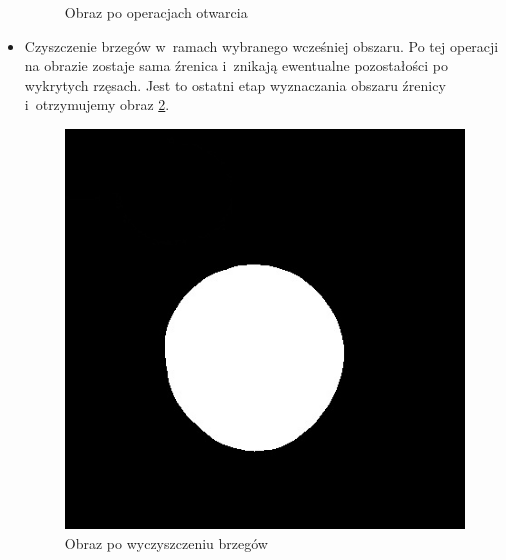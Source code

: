 \begin{itemize}
\begin{figure}[h!]
\begin{center}
\caption{Obraz po operacjach otwarcia}
\label{fig:otwarcie2}
\end{center}
\end{figure}
\item Czyszczenie brzegów w~ramach wybranego wcześniej obszaru. Po tej operacji na obrazie zostaje sama źrenica i~znikają ewentualne pozostałości po wykrytych rzęsach. Jest to ostatni etap wyznaczania obszaru źrenicy i~otrzymujemy obraz \ref{fig:zrenica2}.
\begin{figure}[h!]
\begin{center}
\includegraphics[scale=0.4]{roi2.jpg}
\caption{Obraz po wyczyszczeniu brzegów}
\label{fig:zrenica2}
\end{center}
\end{figure}
\end{itemize}


